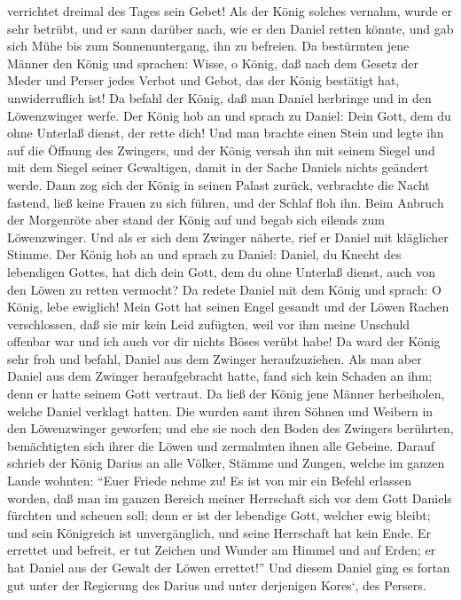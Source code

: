 verrichtet dreimal des Tages sein Gebet!  Als der König
solches vernahm, wurde er sehr betrübt, und er sann darüber nach, wie er
den Daniel retten könnte, und gab sich Mühe bis zum Sonnenuntergang, ihn
zu befreien.  Da bestürmten jene Männer den König und
sprachen: Wisse, o König, daß nach dem Gesetz der Meder und Perser jedes
Verbot und Gebot, das der König bestätigt hat, unwiderruflich ist!
 Da befahl der König, daß man Daniel herbringe und in den
Löwenzwinger werfe. Der König hob an und sprach zu Daniel: Dein Gott,
dem du ohne Unterlaß dienst, der rette dich!  Und man
brachte einen Stein und legte ihn auf die Öffnung des Zwingers, und der
König versah ihn mit seinem Siegel und mit dem Siegel seiner Gewaltigen,
damit in der Sache Daniels nichts geändert werde.  Dann
zog sich der König in seinen Palast zurück, verbrachte die Nacht
fastend, ließ keine Frauen zu sich führen, und der Schlaf floh ihn.
 Beim Anbruch der Morgenröte aber stand der König auf und
begab sich eilends zum Löwenzwinger.  Und als er sich dem
Zwinger näherte, rief er Daniel mit kläglicher Stimme. Der König hob an
und sprach zu Daniel: Daniel, du Knecht des lebendigen Gottes, hat dich
dein Gott, dem du ohne Unterlaß dienst, auch von den Löwen zu retten
vermocht?  Da redete Daniel mit dem König und sprach: O
König, lebe ewiglich!  Mein Gott hat seinen Engel gesandt
und der Löwen Rachen verschlossen, daß sie mir kein Leid zufügten, weil
vor ihm meine Unschuld offenbar war und ich auch vor dir nichts Böses
verübt habe!  Da ward der König sehr froh und befahl,
Daniel aus dem Zwinger heraufzuziehen. Als man aber Daniel aus dem
Zwinger heraufgebracht hatte, fand sich kein Schaden an ihm; denn er
hatte seinem Gott vertraut.  Da ließ der König jene
Männer herbeiholen, welche Daniel verklagt hatten. Die wurden samt ihren
Söhnen und Weibern in den Löwenzwinger geworfen; und ehe sie noch den
Boden des Zwingers berührten, bemächtigten sich ihrer die Löwen und
zermalmten ihnen alle Gebeine.  Darauf schrieb der König
Darius an alle Völker, Stämme und Zungen, welche im ganzen Lande
wohnten: ``Euer Friede nehme zu!  Es ist von mir ein
Befehl erlassen worden, daß man im ganzen Bereich meiner Herrschaft sich
vor dem Gott Daniels fürchten und scheuen soll; denn er ist der
lebendige Gott, welcher ewig bleibt; und sein Königreich ist
unvergänglich, und seine Herrschaft hat kein Ende.  Er
errettet und befreit, er tut Zeichen und Wunder am Himmel und auf Erden;
er hat Daniel aus der Gewalt der Löwen errettet!''  Und
diesem Daniel ging es fortan gut unter der Regierung des Darius und
unter derjenigen Kores`, des Persers.

